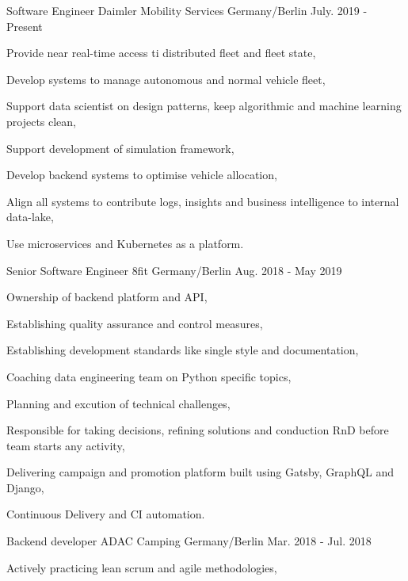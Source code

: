 \begin{cventries}
  \cventry
    {Software Engineer}
    {Daimler Mobility Services}
    {Germany/Berlin}
    {July. 2019 - Present}
    {
      \begin{cvitems}
        \item {Provide near real-time access ti distributed fleet and fleet state,}
        \item {Develop systems to manage autonomous and normal vehicle fleet,}
        \item {Support data scientist on design patterns, keep algorithmic and machine learning projects clean,}
        \item {Support development of simulation framework,}
        \item {Develop backend systems to optimise vehicle allocation,}
        \item {Align all systems to contribute logs, insights and business intelligence to internal data-lake,}
        \item {Use microservices and Kubernetes as a platform.}
      \end{cvitems}
    }
  \cventry
    {Senior Software Engineer}
    {8fit}
    {Germany/Berlin}
    {Aug. 2018 - May 2019}
    {
      \begin{cvitems}
        \item {Ownership of backend platform and API,}
        \item {Establishing quality assurance and control measures,}
        \item {Establishing development standards like single style and documentation,}
        \item {Coaching data engineering team on Python specific topics,}
        \item {Planning and excution of technical challenges,}
        \item {Responsible for taking decisions, refining solutions and conduction RnD before team starts any activity,}
        \item {Delivering campaign and promotion platform built using Gatsby, GraphQL and Django,}
        \item {Continuous Delivery and CI automation.}
      \end{cvitems}
    }
  \cventry
    {Backend developer}
    {ADAC Camping}
    {Germany/Berlin}
    {Mar. 2018 - Jul. 2018}
    {
      \begin{cvitems}
        \item {Actively practicing lean scrum and agile methodologies,}

\end{cvitems}}
\end{cventries}

